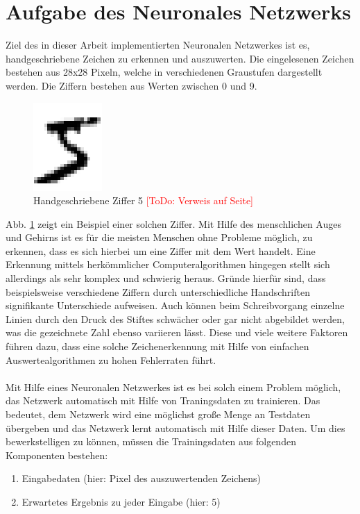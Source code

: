 \section{Aufgabe des Neuronales Netzwerks}
Ziel des in dieser Arbeit implementierten Neuronalen Netzwerkes ist es, handgeschriebene Zeichen zu erkennen und auszuwerten. Die eingelesenen Zeichen bestehen aus 28x28 Pixeln, welche in verschiedenen Graustufen dargestellt werden. Die Ziffern bestehen aus Werten zwischen 0 und 9. 
\begin{figure}[hbt]
	\centering
	\includegraphics[scale=0.6]{Bilder/handdrawn_digit}
	\caption{Handgeschriebene Ziffer 5 \textcolor{red}{[ToDo: Verweis auf Seite]}} 
	\label{fig:handwritten_digit_5} 
\end{figure}
Abb. \ref{fig:handwritten_digit_5} zeigt ein Beispiel einer solchen Ziffer. Mit Hilfe des menschlichen Auges und Gehirns ist es für die meisten Menschen ohne Probleme möglich, zu erkennen, dass es sich hierbei um eine Ziffer mit dem Wert \grqq handelt. Eine Erkennung mittels herkömmlicher Computeralgorithmen hingegen stellt sich allerdings als sehr komplex und schwierig heraus. Gründe hierfür sind, dass beispielsweise verschiedene Ziffern durch unterschiedliche Handschriften signifikante Unterschiede aufweisen. Auch können beim Schreibvorgang einzelne Linien durch den Druck des Stiftes schwächer oder gar nicht abgebildet werden, was die gezeichnete Zahl ebenso variieren lässt. Diese und viele weitere Faktoren führen dazu, dass eine solche Zeichenerkennung mit Hilfe von einfachen Auswertealgorithmen zu hohen Fehlerraten führt. \\ \\
Mit Hilfe eines Neuronalen Netzwerkes ist es bei solch einem Problem möglich, das Netzwerk automatisch mit Hilfe von Traningsdaten zu trainieren. Das bedeutet, dem Netzwerk wird eine möglichst große Menge an Testdaten übergeben und das Netzwerk lernt automatisch mit Hilfe dieser Daten. Um dies bewerkstelligen zu können, müssen die Trainingsdaten aus folgenden Komponenten bestehen:
\begin{enumerate}
\item Eingabedaten (hier: Pixel des auszuwertenden Zeichens)
\item Erwartetes Ergebnis zu jeder Eingabe (hier: 5)
\end{enumerate}

